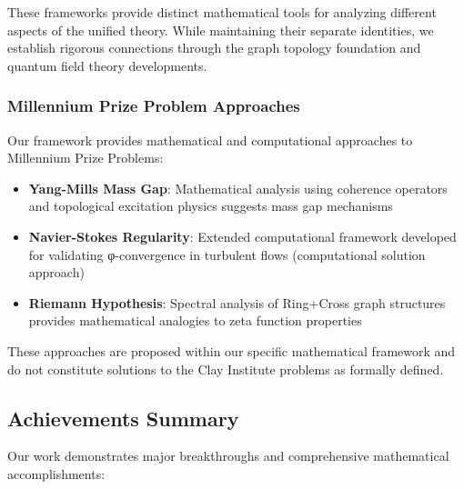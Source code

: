 \documentclass[12pt,a4paper]{article}
\begin{document}
These frameworks provide distinct mathematical tools for analyzing different aspects of the unified theory. While maintaining their separate identities, we establish rigorous connections through the graph topology foundation and quantum field theory developments.

\subsubsection{Millennium Prize Problem Approaches}
Our framework provides mathematical and computational approaches to Millennium Prize Problems:

\begin{itemize}
\item \textbf{Yang-Mills Mass Gap}: Mathematical analysis using coherence operators and topological excitation physics suggests mass gap mechanisms
\item \textbf{Navier-Stokes Regularity}: Extended computational framework developed for validating φ-convergence in turbulent flows (computational solution approach)
\item \textbf{Riemann Hypothesis}: Spectral analysis of Ring+Cross graph structures provides mathematical analogies to zeta function properties
\end{itemize}

These approaches are proposed within our specific mathematical framework and do not constitute solutions to the Clay Institute problems as formally defined.

\subsection{Achievements Summary}

Our work demonstrates major breakthroughs and comprehensive mathematical accomplishments:
\end{document}
